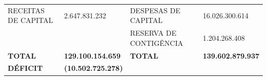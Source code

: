 \documentclass{article}
\begin{document}
\begin{longtable}[c]{m{4cm}|m{2cm}|m{4cm}|m{2cm}}
\multicolumn{1}{L{6cm}}{RECEITAS DE CAPITAL} & \multicolumn{1}{R{3cm}}{2.647.831.232} & \multicolumn{1}{L{6cm}}{ \hspace{1cm} DESPESAS DE CAPITAL} & \multicolumn{1}{R{2.5cm}}{16.026.300.614} \\
\multicolumn{1}{L{6cm}}{} & \multicolumn{1}{R{3cm}}{} & \multicolumn{1}{L{6cm}}{ \hspace{1cm} RESERVA DE CONTIGÊNCIA} & \multicolumn{1}{R{2.5cm}}{1.204.268.408} \\
\multicolumn{1}{L{6cm}}{ \textbf{TOTAL}} & \multicolumn{1}{R{3cm}}{ \textbf{129.100.154.659}} & \multicolumn{1}{L{6cm}}{ \textbf{ \hspace{1cm}TOTAL}} & \multicolumn{1}{R{2.5cm}}{ \textbf{139.602.879.937}} \\
\multicolumn{1}{L{6cm}}{ \textbf{DÉFICIT}} & \multicolumn{1}{R{3cm}}{ \textbf{(10.502.725.278)}} & \multicolumn{1}{L{6cm}}{ \textbf{ \hspace{1cm}}} & \multicolumn{1}{R{2.5cm}}{ \textbf{}} \\\hline\hline\hline\hline\end{longtable}\raggedright\fontsize{7pt}{10pt}\selectfont {Fonte: PPO.}\\\fontsize{7pt}{10pt}\selectfont {ELABORAÇÃO: DCAF/SCPPO/SEPLAG}\\\fontsize{7pt}{10pt}\selectfont {NOTA: Com intuito de evitar a dupla contagem na elaboração desse relatório, foram desconsiderados os valores referentes às operações intra-orçamentárias.}\\
\end{document}
